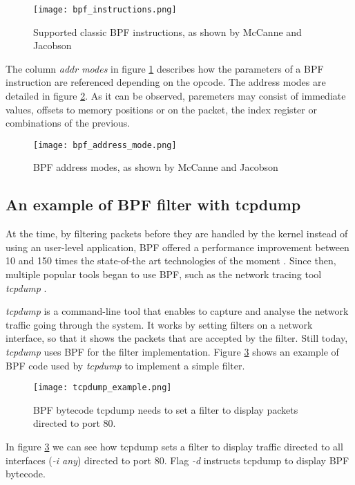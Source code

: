 \begin{figure}[htbp]
	\centering
	\texttt{[image: bpf\_instructions.png]}
	\caption{Supported classic BPF instructions, as shown by McCanne and Jacobson \cite{bpf_bsd_origin_bpf_page7}}
	\label{fig:bpf_instructions}
\end{figure}

The column \textit{addr modes} in figure \ref{fig:bpf_instructions} describes how the parameters of a BPF instruction are referenced depending on the opcode. The address modes are detailed in figure \ref{fig:bpf_address_mode}. As it can be observed, paremeters may consist of immediate values, offsets to memory positions or on the packet, the index register or combinations of the previous.

\begin{figure}[htbp]
	\centering
	\texttt{[image: bpf\_address\_mode.png]}
	\caption{BPF address modes, as shown by McCanne and Jacobson \cite{bpf_bsd_origin_bpf_page8}}
	\label{fig:bpf_address_mode}
\end{figure}

\subsection{An example of BPF filter with tcpdump}
At the time, by filtering packets before they are handled by the kernel instead of using an user-level application, BPF offered a performance improvement between 10 and 150 times the state-of-the art technologies of the moment \cite{bpf_bsd_origin_bpf_page1}. Since then, multiple popular tools began to use BPF, such as the network tracing tool \textit{tcpdump} \cite{tcpdump_page}.

\textit{tcpdump} is a command-line tool that enables to capture and analyse the network traffic going through the system. It works by setting filters on a network interface, so that it shows the packets that are accepted by the filter. Still today, \textit{tcpdump} uses BPF for the filter implementation. Figure \ref{fig:bpf_tcpdump_example} shows an example of BPF code used by \textit{tcpdump} to implement a simple filter.

\begin{figure}[htbp]
	\centering
	\texttt{[image: tcpdump\_example.png]}
	\caption{BPF bytecode tcpdump needs to set a filter to display packets directed to port 80.}
	\label{fig:bpf_tcpdump_example}
\end{figure}

In figure \ref{fig:bpf_tcpdump_example} we can see how tcpdump sets a filter to display traffic directed to all interfaces (\textit{-i any}) directed to port 80. Flag \textit{-d} instructs tcpdump to display BPF bytecode.


